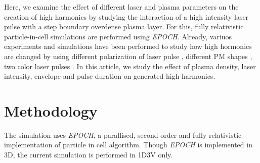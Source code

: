 \documentclass[12pt]{article}
\newenvironment{changemargin}[2]{
\begin{list}{}{
\setlength{\topsep}{0pt}
\setlength{\leftmargin}{#1}
\setlength{\rightmargin}{#2}
\setlength{\listparindent}{\parindent}
\setlength{\itemindent}{\parindent}
\setlength{\parsep}{\parskip}
}
\item[]}{\end{list}}
\begin{document}
\begin{changemargin}{-2cm}{-2cm}
    Here, we examine the effect of different laser and plasma parameters on the creation of high harmonics by studying the interaction of a high intensity laser pulse with a step boundary overdense plasma layer.
    For this, fully relativistic particle-in-cell simulations are performed using \textit{EPOCH}. Already, variuos experiments and simulations have been performed to study how high hormonics are changed by using different polarization of laser pulse \cite{polarization1} \cite{polarization2}, different PM shapes \cite{henri}, two color laser pulses \cite{two-color1} \cite{two-color2}. In this article, we study the effect of plasma density, laser intensity, envelope and pulse duration on generated high harmonics.

    \section{Methodology}
    The simulation uses \textit{EPOCH}, a parallised, second order and fully relativistic implementation of particle in cell algorithm.\cite{EPOCH} Though \textit{EPOCH} is implemented in 3D, the current simulation is performed in 1D3V only.

\end{changemargin}
\end{document}
